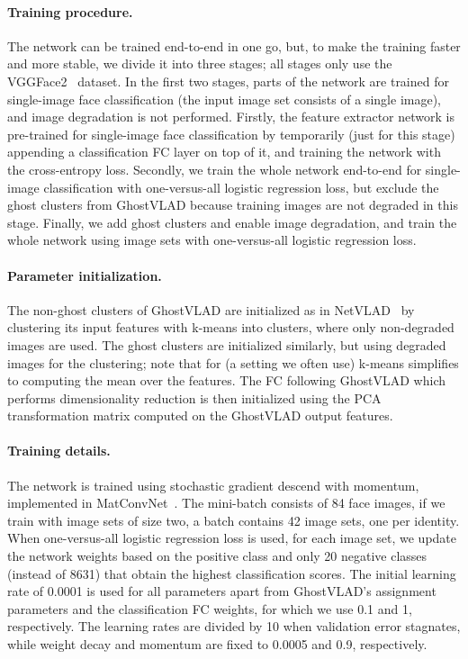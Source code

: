 \documentclass[runningheads]{llncs}
\begin{document}
\paragraph{Training procedure.}
The network can be trained 
end-to-end in one go, but, to make the training faster and
more stable, we divide it
into three stages; all stages only use the VGGFace2~\cite{Cao18}
dataset.
In the first two stages, parts of the network are trained
for single-image face classification
(\ie the input image set consists of a single image),
and image degradation is not performed.
Firstly, the feature extractor network
is pre-trained for single-image face classification
by temporarily (just for this stage)
appending a classification FC layer on top of it,
and training the network with the cross-entropy loss.
Secondly, we train the whole network
end-to-end for single-image classification
with one-versus-all logistic regression loss,
but exclude the ghost clusters from GhostVLAD
because training images are not degraded in this stage.
Finally, we add ghost clusters and enable image degradation,
and train the whole network using image
sets with one-versus-all logistic regression loss.

\paragraph{Parameter initialization.}
The non-ghost clusters of GhostVLAD are initialized
as in NetVLAD~\cite{Arandjelovic16} by clustering
its input features with k-means into  clusters,
where only non-degraded images are used.
The  ghost clusters are initialized similarly, but using
degraded images for the clustering;
note that for  (a setting we often use)
k-means simplifies to computing the mean over the features.
The FC following GhostVLAD which performs dimensionality reduction
is then initialized using 
the PCA transformation matrix computed on the 
GhostVLAD output features.

\paragraph{Training details.}
The network is trained using stochastic gradient 
descend with momentum,
implemented in MatConvNet~\cite{Vedaldi15}.
The mini-batch consists of 84 face images,
\ie if we train with image sets of size two,
a batch contains 42 image sets, one per identity.
When  
one-versus-all logistic regression loss is used,
for each image set, we update the network weights 
based on the positive class and only 20 negative 
classes (instead of 8631) that 
obtain the highest classification scores.
The initial learning rate of 0.0001 is used for all
parameters apart from GhostVLAD's assignment parameters
and the classification FC weights,
for which we use 0.1 and 1, respectively.
The learning rates are divided by 10 when validation error stagnates,
while weight decay and momentum are fixed to 0.0005 and 0.9,
respectively.
\end{document}
